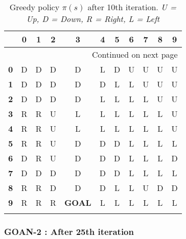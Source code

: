 \documentclass{article}
\begin{document}
\begin{longtable}{|c|c|c|c|c|c|c|c|c|c|c|}
\toprule
{} &  0 &  1 &  2 &  3 &  4 &  5 &  6 &  7 &  8 &  9 \\
\midrule
\endhead
\midrule
\multicolumn{11}{r}{{Continued on next page}} \\
\midrule
\endfoot

\bottomrule
\endlastfoot
\textbf{0} &  D &  D &  D &  D &  L &  D &  U &  U &  U &  U \\\hline
\textbf{1} &  D &  D &  D &  D &  D &  L &  L &  U &  U &  U \\\hline
\textbf{2} &  D &  D &  D &  D &  L &  L &  L &  L &  U &  U \\\hline
\textbf{3} &  R &  R &  U &  L &  L &  L &  L &  L &  L &  U \\\hline
\textbf{4} &  R &  R &  U &  L &  L &  L &  L &  L &  L &  U \\\hline
\textbf{5} &  R &  R &  U &  D &  D &  D &  L &  L &  L &  L \\\hline
\textbf{6} &  D &  R &  U &  D &  D &  D &  L &  L &  L &  D \\\hline
\textbf{7} &  D &  D &  D &  D &  D &  D &  L &  L &  L &  L \\\hline
\textbf{8} &  R &  R &  D &  D &  D &  L &  L &  U &  D &  D \\\hline
\textbf{9} &  R &  R &  R &  \textbf{GOAL} &  L &  L &  L &  L &  L &  L \\\hline
\caption{Greedy policy $\pi(s)$ after 10th iteration. \textit{U = Up, D = Down, R = Right, L = Left}}
\end{longtable}

\clearpage
\subsubsection*{GOAN-2 : After 25th iteration}
\end{document}
